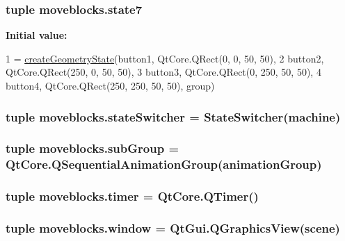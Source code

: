 \subsubsection[{state7}]{\setlength{\rightskip}{0pt plus 5cm}tuple moveblocks.\+state7}\label{namespacemoveblocks_a2c080f1b384feaceca2e074ffb544eef}
{\bfseries Initial value\+:}
\begin{DoxyCode}
1 = \hyperlink{namespacemoveblocks_a0ad74b53c498f8dd97b3a612778b8661}{createGeometryState}(button1, QtCore.QRect(0, 0, 50, 50),
2             button2, QtCore.QRect(250, 0, 50, 50),
3             button3, QtCore.QRect(0, 250, 50, 50),
4             button4, QtCore.QRect(250, 250, 50, 50), group)
\end{DoxyCode}
\hypertarget{namespacemoveblocks_a4b5b2bb73e102097819c7c29de235c9b}{}
\subsubsection[{state\+Switcher}]{\setlength{\rightskip}{0pt plus 5cm}tuple moveblocks.\+state\+Switcher = {\bf State\+Switcher}({\bf machine})}\label{namespacemoveblocks_a4b5b2bb73e102097819c7c29de235c9b}
\hypertarget{namespacemoveblocks_ab082ce47ad00aa983580a5d6a06d78fb}{}
\subsubsection[{sub\+Group}]{\setlength{\rightskip}{0pt plus 5cm}tuple moveblocks.\+sub\+Group = Qt\+Core.\+Q\+Sequential\+Animation\+Group({\bf animation\+Group})}\label{namespacemoveblocks_ab082ce47ad00aa983580a5d6a06d78fb}
\hypertarget{namespacemoveblocks_a92306696512f100857e8b662404315bc}{}
\subsubsection[{timer}]{\setlength{\rightskip}{0pt plus 5cm}tuple moveblocks.\+timer = Qt\+Core.\+Q\+Timer()}\label{namespacemoveblocks_a92306696512f100857e8b662404315bc}
\hypertarget{namespacemoveblocks_aa360cd62b1b379bc2de58e36a26259b1}{}
\subsubsection[{window}]{\setlength{\rightskip}{0pt plus 5cm}tuple moveblocks.\+window = Qt\+Gui.\+Q\+Graphics\+View({\bf scene})}\label{namespacemoveblocks_aa360cd62b1b379bc2de58e36a26259b1}
